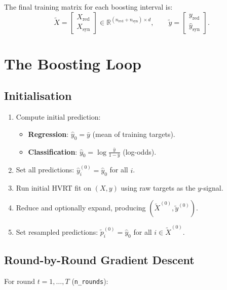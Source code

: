 \documentclass[11pt,a4paper]{article}
\newcommand{\R}{\mathbb{R}}
\theoremstyle{definition}
\begin{document}
The final training matrix for each boosting interval is:
\begin{equation}
    \tilde{X} = \begin{bmatrix} X_{\text{red}} \\ X_{\text{syn}} \end{bmatrix}
    \in \R^{(n_{\text{red}} + n_{\text{syn}}) \times d},
    \qquad
    \tilde{y} = \begin{bmatrix} y_{\text{red}} \\ \hat{y}_{\text{syn}} \end{bmatrix}.
\end{equation}


\section{The Boosting Loop}

\subsection{Initialisation}

\begin{enumerate}[nosep]
    \item Compute initial prediction:
        \begin{itemize}[nosep]
            \item \textbf{Regression}: $\hat{y}_0 = \bar{y}$ (mean of training targets).
            \item \textbf{Classification}: $\hat{y}_0 = \log\frac{\bar{y}}{1 - \bar{y}}$ (log-odds).
        \end{itemize}
    \item Set all predictions: $\hat{y}_i^{(0)} = \hat{y}_0$ for all $i$.
    \item Run initial HVRT fit on $(X, y)$ using raw targets as the $y$-signal.
    \item Reduce and optionally expand, producing $(\tilde{X}^{(0)}, \tilde{y}^{(0)})$.
    \item Set resampled predictions:
        $\tilde{p}_i^{(0)} = \hat{y}_0$ for all $i \in \tilde{X}^{(0)}$.
\end{enumerate}

\subsection{Round-by-Round Gradient Descent}

For round $t = 1, \dots, T$ (\texttt{n\_rounds}):
\end{document}
